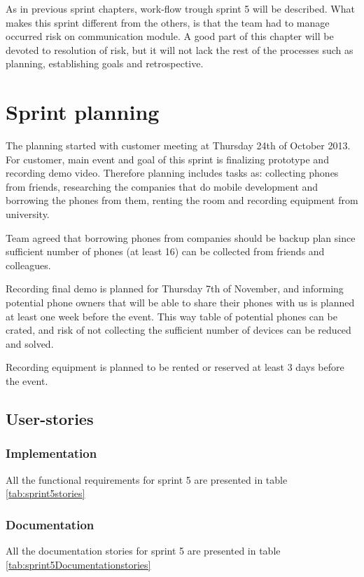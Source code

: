 As in previous sprint chapters, work-flow trough sprint 5 will be described. What makes this sprint different from the others, is that the team had to manage occurred risk on communication module. A good part of this chapter will be devoted to resolution of risk, but it will not lack the rest of the processes such as planning, establishing goals and retrospective.


\section{Sprint planning}

The planning started with customer meeting at Thursday 24th of October 2013. For customer, main event and goal of this sprint is finalizing prototype and recording demo video. Therefore planning includes tasks as: collecting phones from friends, researching the companies that do mobile development and borrowing the phones from them, renting the room and recording equipment from university.

Team agreed that borrowing phones from companies should be backup plan since sufficient number of phones (at least 16) can be collected from friends and colleagues. 

Recording final demo is planned for Thursday 7th of November, and informing potential phone owners that will be able to share their phones with us is planned at least one week before the event. This way table of potential phones can be crated, and risk of not collecting the sufficient number of devices can be reduced and solved. 

Recording equipment is planned to be rented or reserved at least 3 days before the event. 

\subsection{User-stories}
\subsubsection*{Implementation}
All the functional requirements for sprint 5 are presented in table \ref{tab:sprint5stories}

\subsubsection*{Documentation}
All the documentation stories for sprint 5 are presented in table \ref{tab:sprint5Documentationstories}

